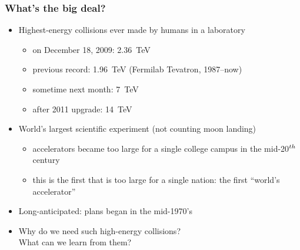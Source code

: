 \documentclass[compress]{beamer}
\begin{document}
\begin{frame}
\frametitle{What's the big deal?}

\begin{itemize}\setlength{\itemsep}{0.3 cm}
\item Highest-energy collisions ever made by humans in a laboratory
\begin{itemize}\setlength{\itemsep}{0.1 cm}
\item on December 18, 2009: 2.36~TeV
\item previous record: 1.96~TeV (Fermilab Tevatron, 1987--now)
\item sometime next month: 7~TeV
\item after 2011 upgrade: 14~TeV
\end{itemize}

\item World's largest scientific experiment (not counting moon landing)
\begin{itemize}\setlength{\itemsep}{0.1 cm}
\item accelerators became too large for a single college campus in the mid-20$^{\scriptsize th}$ century
\item this is the first that is too large for a single nation: the first ``world's accelerator''
\end{itemize}

\item Long-anticipated: plans began in the mid-1970's

\item Why do we need such high-energy collisions?  \\ What can we learn from them?
\end{itemize}
\end{frame}
\end{document}
